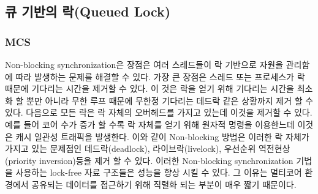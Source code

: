 \subsection{큐 기반의 락(Queued Lock)}


\subsubsection{MCS}


Non-blocking synchronization은 장점은 여러 스레드들이 락 기반으로 자원을 관리함에 따라
 발생하는 문제를 해결할 수 있다. 
가장 큰 장점은 스레드 또는 프로세스가 락 때문에 기다리는 시간을 제거할 수 있다.
이 것은 락을 얻기 위해 기다리는 시간을 최소화 할 뿐만 아니라 무한 루프 때문에 무한정 기다리는 
데드락 같은 상황까지 제거 할 수 있다. 
다음으로 모든 락은 락 자체의 오버헤드를 가지고 있는데 이것을 제거할 수 있다. 
예를 들어 코어 수가 증가 할 수록 락 자체를 얻기 위해 원자적 명령을 이용한느데 이것은 캐시 일관성 트래픽을 
발생한다. 
이와 같이 Non-blocking 방법은 이러한 락 자체가 가지고 있는 문제점인 데드락(deadlock), 라이브락(livelock), 
우선순위 역전현상(priority inversion)등을 제거 할 수 있다. 
이러한 Non-blocking synchronization 기법을 사용하는 lock-free 자료 구조들은 성능을 향상 시킬 수 있다. 
그 이유는 멀티코어 환경에서 공유되는 데이터를 접근하기 위해 직렬화 되는 부분이 매우 짧기 때문이다. 





